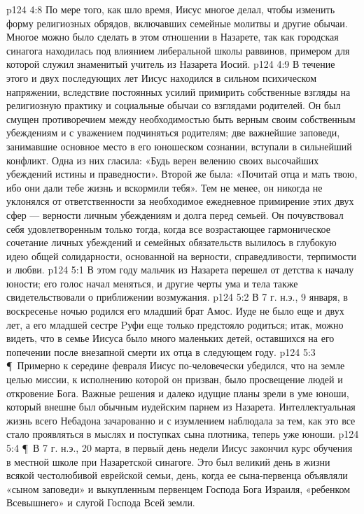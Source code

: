 \vs p124 4:8 По мере того, как шло время, Иисус многое делал, чтобы изменить форму религиозных обрядов, включавших семейные молитвы и другие обычаи. Многое можно было сделать в этом отношении в Назарете, так как городская синагога находилась под влиянием либеральной школы раввинов, примером для которой служил знаменитый учитель из Назарета Иосий.
\vs p124 4:9 В течение этого и двух последующих лет Иисус находился в сильном психическом напряжении, вследствие постоянных усилий примирить собственные взгляды на религиозную практику и социальные обычаи со взглядами родителей. Он был смущен противоречием между необходимостью быть верным своим собственным убеждениям и с уважением подчиняться родителям; две важнейшие заповеди, занимавшие основное место в его юношеском сознании, вступали в сильнейший конфликт. Одна из них гласила: «Будь верен велению своих высочайших убеждений истины и праведности». Второй же была: «Почитай отца и мать твою, ибо они дали тебе жизнь и вскормили тебя». Тем не менее, он никогда не уклонялся от ответственности за необходимое ежедневное примирение этих двух сфер --- верности личным убеждениям и долга перед семьей. Он почувствовал себя удовлетворенным только тогда, когда все возрастающее гармоническое сочетание личных убеждений и семейных обязательств вылилось в глубокую идею общей солидарности, основанной на верности, справедливости, терпимости и любви.
\vs p124 5:1 В этом году мальчик из Назарета перешел от детства к началу юности; его голос начал меняться, и другие черты ума и тела также свидетельствовали о приближении возмужания.
\vs p124 5:2 В 7 г. н.э., 9 января, в воскресенье ночью родился его младший брат Амос. Иуде не было еще и двух лет, а его младшей сестре Pуфи еще только предстояло родиться; итак, можно видеть, что в семье Иисуса было много маленьких детей, оставшихся на его попечении после внезапной смерти их отца в следующем году.
\vs p124 5:3 \P\ Примерно к середине февраля Иисус по\hyp{}человечески убедился, что на земле целью миссии, к исполнению которой он призван, было просвещение людей и откровение Бога. Важные решения и далеко идущие планы зрели в уме юноши, который внешне был обычным иудейским парнем из Назарета. Интеллектуальная жизнь всего Небадона зачарованно и с изумлением наблюдала за тем, как это все стало проявляться в мыслях и поступках сына плотника, теперь уже юноши.
\vs p124 5:4 \P\ В 7 г. н.э., 20 марта, в первый день недели Иисус закончил курс обучения в местной школе при Назаретской синагоге. Это был великий день в жизни всякой честолюбивой еврейской семьи, день, когда ее сына\hyp{}первенца объявляли «сыном заповеди» и выкупленным первенцем Господа Бога Израиля, «ребенком Всевышнего» и слугой Господа Всей земли.

